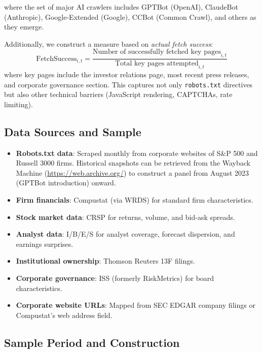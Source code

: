 \documentclass[12pt,a4paper]{article}
\begin{document}
\noindent where the set of major AI crawlers includes GPTBot (OpenAI), ClaudeBot (Anthropic), Google-Extended (Google), CCBot (Common Crawl), and others as they emerge.

Additionally, we construct a measure based on \emph{actual fetch success}:
\begin{equation}
\text{FetchSuccess}_{i,t} = \frac{\text{Number of successfully fetched key pages}_{i,t}}{\text{Total key pages attempted}_{i,t}}
\end{equation}
\noindent where key pages include the investor relations page, most recent press releases, and corporate governance section. This captures not only \texttt{robots.txt} directives but also other technical barriers (JavaScript rendering, CAPTCHAs, rate limiting).

\subsection{Data Sources and Sample}

\begin{itemize}
    \item \textbf{Robots.txt data}: Scraped monthly from corporate websites of S\&P 500 and Russell 3000 firms. Historical snapshots can be retrieved from the Wayback Machine (\url{https://web.archive.org/}) to construct a panel from August 2023 (GPTBot introduction) onward.

    \item \textbf{Firm financials}: Compustat (via WRDS) for standard firm characteristics.

    \item \textbf{Stock market data}: CRSP for returns, volume, and bid-ask spreads.

    \item \textbf{Analyst data}: I/B/E/S for analyst coverage, forecast dispersion, and earnings surprises.

    \item \textbf{Institutional ownership}: Thomson Reuters 13F filings.

    \item \textbf{Corporate governance}: ISS (formerly RiskMetrics) for board characteristics.

    \item \textbf{Corporate website URLs}: Mapped from SEC EDGAR company filings or Compustat's web address field.
\end{itemize}

\subsection{Sample Period and Construction}
\end{document}

